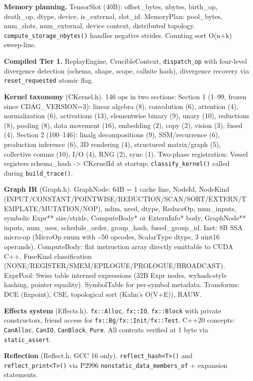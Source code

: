 \textbf{Memory planning.} TensorSlot (40B): offset\_bytes, nbytes, birth\_op, death\_op, dtype, device, is\_external, slot\_id. MemoryPlan: pool\_bytes, num\_slots, num\_external, device context, distributed topology. \texttt{compute\_storage\_nbytes()} handles negative strides. Counting sort O(n+k) sweep-line.

\textbf{Compiled Tier 1.} ReplayEngine, CrucibleContext, \texttt{dispatch\_op} with four-level divergence detection (schema, shape, scope, callsite hash), divergence recovery via \texttt{reset\_requested} atomic flag.

\textbf{Kernel taxonomy} (CKernel.h). 146 ops in two sections: Section 1 (1--99, frozen since CDAG\_VERSION=3): linear algebra (8), convolution (6), attention (4), normalization (6), activations (13), elementwise binary (9), unary (10), reductions (8), pooling (8), data movement (16), embedding (2), copy (2), vision (3), fused (4). Section 2 (100--146): linalg decompositions (9), SSM/recurrence (6), production inference (6), 3D rendering (4), structured matrix/graph (5), collective comms (10), I/O (4), RNG (2), sync (1). Two-phase registration: Vessel registers schema\_hash -\textgreater{} CKernelId at startup; \texttt{classify\_kernel()} called during \texttt{build\_trace()}.

\textbf{Graph IR} (Graph.h). GraphNode: 64B = 1 cache line, NodeId, NodeKind (INPUT/CONSTANT/POINTWISE/REDUCTION/SCAN/SORT/EXTERN/TEMPLATE/MUTATION/NOP), ndim, nred, dtype, ReduceOp, num\_inputs, symbolic Expr** size/stride, ComputeBody* or ExternInfo* body, GraphNode** inputs, num\_uses, schedule\_order, group\_hash, fused\_group\_id. Inst: 8B SSA micro-op (MicroOp enum with \textasciitilde50 opcodes, ScalarType dtype, 3 uint16 operands). ComputeBody: flat instruction array directly emittable to CUDA C++. FuseKind classification (NONE/REGISTER/SMEM/EPILOGUE/PROLOGUE/BROADCAST). ExprPool: Swiss table interned expressions (32B Expr nodes, wyhash-style hashing, pointer equality). SymbolTable for per-symbol metadata. Transforms: DCE (fixpoint), CSE, topological sort (Kahn's O(V+E)), RAUW.

\textbf{Effects system} (Effects.h). \texttt{fx::Alloc}, \texttt{fx::IO}, \texttt{fx::Block} with private constructors, friend access for \texttt{fx::Bg}/\texttt{fx::Init}/\texttt{fx::Test}. C++20 concepts: \texttt{CanAlloc}, \texttt{CanIO}, \texttt{CanBlock}, \texttt{Pure}. All contexts verified at 1 byte via \texttt{static\_assert}.

\textbf{Reflection} (Reflect.h, GCC 16 only). \texttt{reflect\_hash\textless{}T\textgreater{}()} and \texttt{reflect\_print\textless{}T\textgreater{}()} via P2996 \texttt{nonstatic\_data\_members\_of} + expansion statements.

